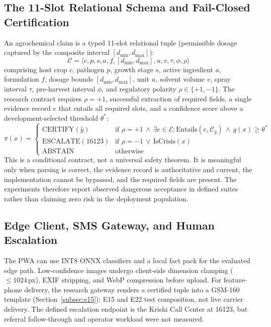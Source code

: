 \documentclass[11pt,a4paper]{article}
\begin{document}
\subsection{The 11-Slot Relational Schema and Fail-Closed Certification}
\label{subsec:schema}
An agrochemical claim is a typed 11-slot relational tuple (permissible dosage captured by the composite interval $[d_{\min}, d_{\max}]$):
\begin{equation}
\label{eq:claim_tuple}
\mathcal{C} = \langle c, p, s, a, f, [d_{\min}, d_{\max}], u, v, \tau, \phi, \rho \rangle
\end{equation}
comprising host crop $c$, pathogen $p$, growth stage $s$, active ingredient $a$, formulation $f$, dosage bounds $[d_{\min}, d_{\max}]$, unit $u$, solvent volume $v$, spray interval $\tau$, pre-harvest interval $\phi$, and regulatory polarity $\rho \in \{+1,-1\}$. The research contract requires $\rho=+1$, successful extraction of required fields, a single evidence record $e$ that entails all required slots, and a confidence score above a development-selected threshold $\theta^*$:
\begin{equation}
\label{eq:certification_contract}
\pi(x) = \begin{cases}
\text{CERTIFY}(\hat{y}) & \text{if } \rho{=}{+}1 \,\land\, \exists e \in \mathcal{E}: \text{Entails}(e,\mathcal{C}_{\hat{y}}) \,\land\, g(x) \ge \theta^* \\
\text{ESCALATE}(16123) & \text{if } \rho{=}{-}1 \,\lor\, \text{IsCrisis}(x) \\
\text{ABSTAIN} & \text{otherwise}
\end{cases}
\end{equation}
This is a conditional contract, not a universal safety theorem. It is meaningful only when parsing is correct, the evidence record is authoritative and current, the implementation cannot be bypassed, and the required fields are present. The experiments therefore report observed dangerous acceptance in defined suites rather than claiming zero risk in the deployment population.

\subsection{Edge Client, SMS Gateway, and Human Escalation}
\label{subsec:client}
The PWA can use INT8 ONNX classifiers and a local fact pack for the evaluated edge path. Low-confidence images undergo client-side dimension clamping ($\leq 1024$\,px), EXIF stripping, and WebP compression before upload. For feature-phone delivery, the research gateway renders a certified tuple into a GSM-160 template (Section~\ref{subsec:e15}); E15 and E22 test composition, not live carrier delivery. The defined escalation endpoint is the Krishi Call Center at 16123, but referral follow-through and operator workload were not measured.
\end{document}
